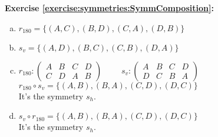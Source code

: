 \noindent\textbf{Exercise \ref{exercise:symmetries:SymmComposition}:}
\begin{enumerate}[(a)]
\item
$r_{180} = \{(A, C), (B, D), (C, A), (D, B)\}$

\item
$s_v = \{(A, D), (B, C), (C, B), (D, A)\}$

\item 
$r_{180}: \begin{pmatrix}
A & B & C & D\\
C & D & A & B
\end{pmatrix}$
$\qquad s_v: \begin{pmatrix}
A & B & C & D\\
D & C & B & A
\end{pmatrix}$\\
$r_{180}\circ s_v = \{(A,B), (B,A), (C,D), (D,C)\}$\\
It's the symmetry $s_h$.

\item
$s_v\circ r_{180}= \{(A,B), (B,A), (C,D), (D,C)\}$\\
It's the symmetry $s_h$.
\end{enumerate}

